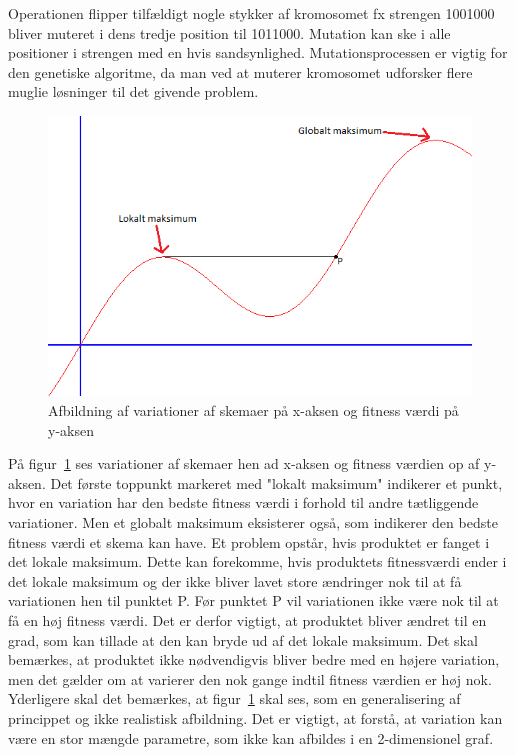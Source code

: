 Operationen flipper tilfældigt nogle stykker af kromosomet fx strengen 1001000 bliver muteret i dens tredje position til 1011000. Mutation kan ske i alle positioner i strengen med en hvis sandsynlighed. Mutationsprocessen er vigtig for den genetiske algoritme, da man ved at muterer kromosomet udforsker flere muglie løsninger til det givende problem.
\begin{figure}[!h]
  \includegraphics{partials/graphics/lokaltmaksimum.png}
  \caption{Afbildning af variationer af skemaer på x-aksen og fitness værdi på y-aksen}
  \label{fig:Lokalmax}
\end{figure}

På figur~\ref{fig:Lokalmax} ses variationer af skemaer hen ad x-aksen og fitness værdien op af y-aksen. Det første toppunkt markeret med "lokalt maksimum" indikerer et punkt, hvor en variation har den bedste fitness værdi i forhold til andre tætliggende variationer. Men et globalt maksimum eksisterer også, som indikerer den bedste fitness værdi et skema kan have. Et problem opstår, hvis produktet er fanget i det lokale maksimum. Dette kan forekomme, hvis produktets fitnessværdi ender i det lokale maksimum og der ikke bliver lavet store ændringer nok til at få variationen hen til punktet P. Før punktet P vil variationen ikke være nok til at få en høj fitness værdi. Det er derfor vigtigt, at produktet bliver ændret til en grad, som kan tillade at den kan bryde ud af det lokale maksimum. Det skal bemærkes, at produktet ikke nødvendigvis bliver bedre med en højere variation, men det gælder om at varierer den nok gange indtil fitness værdien er høj nok. Yderligere skal det bemærkes, at figur~\ref{fig:Lokalmax} skal ses, som en generalisering af princippet og ikke realistisk afbildning. Det er vigtigt, at forstå, at variation kan være en stor mængde parametre, som ikke kan afbildes i en 2-dimensionel graf.

